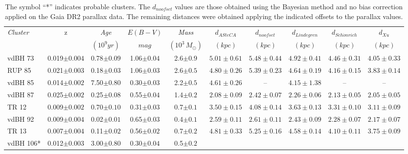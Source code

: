 \documentclass[draft]{aa}
\begin{document}
\begin{table}[ht]
\small
\centering
\caption{The symbol ``*'' indicates probable clusters. The $d_{noofset}$ values
are those obtained using the Bayesian method and no bias correction applied on
the Gaia DR2 parallax data. The remaining distances were obtained applying the
indicated offsets to the parallax values.}
\begin{tabular}{lccccccccc}
\hline \hline 
 \emph{Cluster} & z & \emph{Age} & $E(B-V)$ & \emph{Mass} &
 $d_{ASteCA}$ & $d_{noofset}$ & $d_{Lindegren}$ & $d_{Sch\ddot{o}nrich}$ &
 $d_{Xu}$ \\
& & $(10^9 yr)$ & $mag$ & $(10^3\,M_{\odot})$ & $(kpc)$ & $(kpc)$ & $(kpc)$ &
$(kpc)$ & $(kpc)$\\
 \hline
 vdBH 73 & 0.019$\pm0.004$ & 0.78$\pm0.09$ & 1.06$\pm0.04$ & 2.6$\pm0.9$ &
  $5.01\pm0.61$ & $5.48\pm0.44$ & $4.92\pm0.41$ & $4.46\pm0.31$ & $4.05\pm0.33$\\
 RUP 85 & 0.021$\pm0.003$ & 0.18$\pm0.03$ & 1.06$\pm0.03$ & 2.6$\pm0.5$ &
 $4.80\pm0.26$ & $5.39\pm0.23$ & $4.64\pm0.19$ & $4.16\pm0.15$ & $3.83\pm0.14$\\
 vdBH 85 & 0.014$\pm0.002$ & 7.50$\pm0.80$ & 0.30$\pm0.03$ & 2.2$\pm0.5$ &
  $4.61\pm0.26$ & -- & $4.15\pm1.38$ & -- & --\\
 vdBH 87 & 0.025$\pm0.002$ & 0.25$\pm0.08$ & 0.55$\pm0.04$ & 1.4$\pm0.2$ &
 $2.08\pm0.09$ & $2.42\pm0.07$ & $2.26\pm0.06$ & $2.13\pm0.05$ & $2.05\pm0.05$\\
%
 TR 12 & 0.009$\pm0.002$ & 0.70$\pm0.10$ & 0.31$\pm0.03$ & 0.7$\pm0.1$ &
 $3.50\pm0.15$ & $4.08\pm0.14$ & $3.63\pm0.13$ & $3.31\pm0.10$ & $3.11\pm0.09$\\
 vdBH 92 & 0.009$\pm0.004$ & 0.02$\pm0.01$ & 0.65$\pm0.03$ & 0.4$\pm0.1$ &
 $2.59\pm0.11$ & $2.61\pm0.11$ & $2.43\pm0.09$ & $2.28\pm0.07$ & $2.17\pm0.07$\\
 TR 13 & 0.007$\pm0.004$ & 0.11$\pm0.02$ & 0.56$\pm0.02$ & 0.7$\pm0.2$ &
 $4.81\pm0.33$ & $5.25\pm0.16$ & $4.58\pm0.14$ & $4.10\pm0.11$ & $3.75\pm0.09$\\
 vdBH 106* & 0.012$\pm0.003$ & 3.00$\pm0.80$ & 0.30$\pm0.04$ & 0.5$\pm0.2$ &

\end{tabular}
\end{table}
\end{document}
